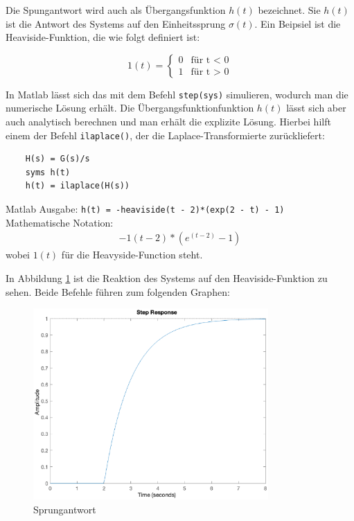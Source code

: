 Die Spungantwort wird auch als Übergangsfunktion $h(t)$ bezeichnet.
Sie $h(t)$ ist die Antwort des Systems auf den Einheitssprung $\sigma (t)$.
Ein Beipsiel ist die Heaviside-Funktion, die wie folgt definiert ist:

\[
1 (t) = \begin{cases} 0 & \text{für t < 0} \\ 1 & \text{für t > 0} \end{cases}  
\]

In Matlab lässt sich das mit dem Befehl \texttt{step(sys)} simulieren, wodurch man die numerische Lösung erhält. Die Übergangsfunktionfunktion $h(t)$ lässt sich aber auch analytisch berechnen und man erhält die explizite Lösung. Hierbei hilft einem der Befehl \texttt{ilaplace()}, der die Laplace-Transformierte zurückliefert:

\begin{verbatim}
    H(s) = G(s)/s
    syms h(t)
    h(t) = ilaplace(H(s))
\end{verbatim} 

Matlab Ausgabe: \texttt{h(t) = -heaviside(t - 2)*(exp(2 - t) - 1)}\\
Mathematische Notation: 
\begin{align*}
    -1(t-2)*(e^{(t-2)}-1)
\end{align*} wobei $1(t)$ für die Heavyside-Function steht.


In Abbildung \ref{fig:sprung} ist die Reaktion des Systems auf den Heaviside-Funktion zu sehen.
Beide Befehle führen zum folgenden Graphen:

\begin{figure}[H]
    \label{fig:sprung}
    \centering
    \includegraphics[width=0.8\textwidth]{Bilder/SprungantwortPT1Tt.eps}
    \caption{Sprungantwort}
 \end{figure}

